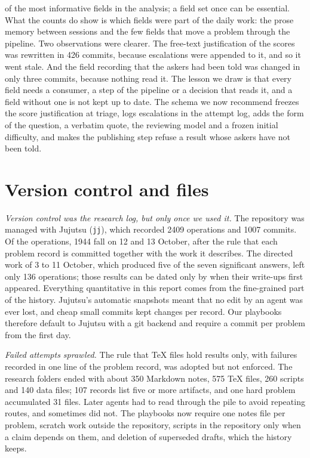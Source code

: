 \documentclass[11pt]{amsart}
\newcommand*{\sectionbreak}{\clearpage} %
\begin{document}
of the most informative fields in the analysis; a field set once can be
essential. What the counts do show is which fields were part of the daily work:
the prose memory between sessions and the few fields that move a problem
through the pipeline. Two observations were clearer. The free-text
justification of the scores was rewritten in 426 commits, because escalations
were appended to it, and so it went stale. And the field recording that the
askers had been told was changed in only three commits, because nothing read
it. The lesson we draw is that every field needs a consumer, a step of the
pipeline or a decision that reads it, and a field without one is not kept up to
date. The schema we now recommend freezes the score justification at triage,
logs escalations in the attempt log, adds the form of the question, a verbatim
quote, the reviewing model and a frozen initial difficulty, and makes the
publishing step refuse a result whose askers have not been told.

\sectionbreak
\section{Version control and files}\label{app:history}

\emph{Version control was the research log, but only once we used it.} The
repository was managed with Jujutsu (\texttt{jj}), which recorded 2409
operations and 1007 commits. Of the operations, 1944 fall on 12 and 13 October,
after the rule that each problem record is committed together with the work it
describes. The directed work of 3 to 11 October, which produced five of the
seven significant answers, left only 136 operations; those results can be dated
only by when their write-ups first appeared. Everything quantitative in this
report comes from the fine-grained part of the history. Jujutsu's automatic
snapshots meant that no edit by an agent was ever lost, and cheap small commits
kept changes per record. Our playbooks therefore default to Jujutsu with a git
backend and require a commit per problem from the first day.\@

\emph{Failed attempts sprawled.} The rule that TeX files hold results only,
with failures recorded in one line of the problem record, was adopted but not
enforced. The research folders ended with about 350 Markdown notes, 575 TeX
files, 260 scripts and 140 data files; 107 records list five or more artifacts,
and one hard problem accumulated 31 files. Later agents had to read through the
pile to avoid repeating routes, and sometimes did not. The playbooks now
require one notes file per problem, scratch work outside the repository,
scripts in the repository only when a claim depends on them, and deletion of
superseded drafts, which the history keeps.
\end{document}
